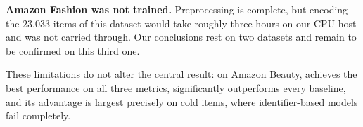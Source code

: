\textbf{Amazon Fashion was not trained.} Preprocessing is complete, but encoding
the 23{,}033 items of this dataset would take roughly three hours on our CPU
host and was not carried through. Our conclusions rest on two datasets and
remain to be confirmed on this third one.

These limitations do not alter the central result: on Amazon Beauty, \model{}
achieves the best performance on all three metrics, significantly outperforms
every baseline, and its advantage is largest precisely on cold items, where
identifier-based models fail completely.
